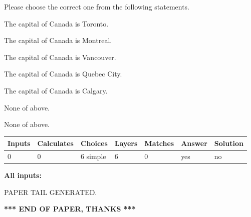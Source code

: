 \documentclass[12pt]{article}
\begin{document}
  
Please choose the correct one from the following statements.
 
 
The capital of Canada is Toronto.
 
 
The capital of Canada is Montreal.
 
 
The capital of Canada is Vancouver.
 
 
The capital of Canada is Quebec City.
 
 
The capital of Canada is Calgary.
 
 
 None of above.
 
 
\noindent{}
 
 
 None of above.
 
 
\noindent{}
 
 
   
   
   
   
\noindent\begin{tabular}{|l|l|l|l|l|l|l|}
 \hline
Inputs & Calculates & Choices & Layers & Matches & Answer & Solution \\ \hline
 0  & 
 0  & 
 6
  simple  
  & 
 6  & 
 0  & 
  yes & 
  no 
  \\ \hline
 \end{tabular}
   
   
   
   
\noindent{}
   
   
   
   
\noindent\vspace{0.1in}\hspace{-0.08in} {\textbf{\Large{All inputs: }}}
   
   
   
   
   
   
 \vspace{0.2in}
 
   
   
\vspace{2.0in} PAPER TAIL GENERATED.
   
   
   
   
\vspace{1.0in} 
{\textbf{\large{ *** END OF PAPER, THANKS *** }}} 
   
\end{document}

